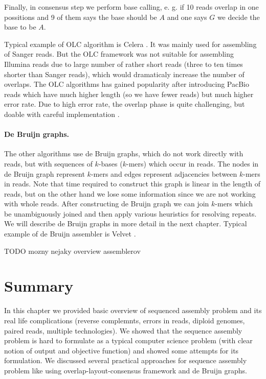 Finally, in consensus step we perform base calling, e. g. if 10 reads overlap in
one possitions and 9 of them says the base should be $A$ and one says $G$ we decide the base to
be $A$.

Typical example of OLC algorithm is Celera \citep{Celera}.
It was mainly used for assembling of Sanger reads. But the OLC
framework was not suitable for assembling Illumina reads due to large number
of rather short reads (three to ten times shorter than Sanger reads), which
would dramaticaly increase the number of overlaps. 
The OLC algorithms has gained popularity after introducing PacBio reads
which have much higher length (so we have fewer reads) but much higher error rate.
Due to high error rate, the overlap phase is quite challenging, but
doable with careful implementation \citep{myers2014efficient}. 

\paragraph{De Bruijn graphs.}
The other algorithms use de Bruijn graphs, which do not work directly with reads, but
with sequences of $k$-bases ($k$-mers) which occur in reads. The nodes in de Bruijn graph represent $k$-mers
and edges represent adjacencies between $k$-mers in reads. Note that time
required to construct this graph is linear in the length of reads, but on the other hand
we lose some information since we are not working with whole reads.
After constructing de Bruijn graph we can join $k$-mers which be
unambiguously joined and then apply various heuristics for resolving repeats.
We will describe de Bruijn graphs in more detail in the next chapter.
Typical example of de Bruijn assembler is Velvet \citep{Velvet}.

TODO mozny nejaky overview assemblerov

\section{Summary}

In this chapter we provided basic overview of sequenced assembly problem
and its real life complications (reverse complemnts, errors in reads,
diploid genomes, paired reads, multiple technologies). 
We showed that the sequence assembly problem is hard to formulate
as a typical computer science problem (with clear notion of output and objective function)
and showed some attempts for its formulation.
We discussed several practical approaches for sequence assembly problem like
using overlap-layout-consensus framework and de Bruijn graphs.

